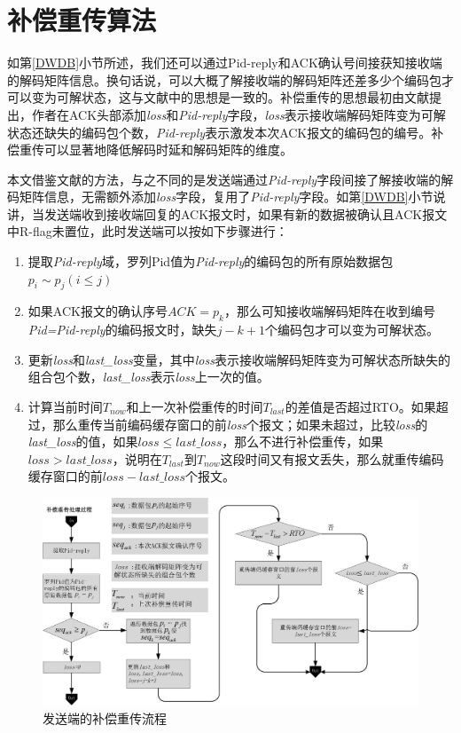 \section{补偿重传算法}\label{sec:loss}
如第\ref{DWDB}小节所述，我们还可以通过Pid-reply和ACK确认号间接获知接收端的解码矩阵信息。换句话说，可以大概了解接收端的解码矩阵还差多少个编码包才可以变为可解状态，这与文献\cite{song2011self}中的思想是一致的。补偿重传的思想最初由文献\cite{5403816}提出，作者在ACK头部添加\emph{loss}和\emph{Pid-reply}字段，\emph{loss}表示接收端解码矩阵变为可解状态还缺失的编码包个数，\emph{Pid-reply}表示激发本次ACK报文的编码包的编号。补偿重传可以显著地降低解码时延和解码矩阵的维度。
\par
本文借鉴文献\cite{5403816}的方法，与之不同的是发送端通过\emph{Pid-reply}字段间接了解接收端的解码矩阵信息，无需额外添加\emph{loss}字段，复用了\emph{Pid-reply}字段。如第\ref{DWDB}小节说讲，当发送端收到接收端回复的ACK报文时，如果有新的数据被确认且ACK报文中R-flag未置位，此时发送端可以按如下步骤进行：
\begin{enumerate}[fullwidth,itemindent=2em,label=(\arabic*)]
	\item 提取\emph{Pid-reply}域，罗列Pid值为\emph{Pid-reply}的编码包的所有原始数据包$p_i \sim p_j\left(i \le j\right)$
	\item 如果ACK报文的确认序号$ACK=p_k$，那么可知接收端解码矩阵在收到编号\emph{Pid=Pid-reply}的编码报文时，缺失$j-k+1$个编码包才可以变为可解状态。
	\item 更新\emph{loss}和\emph{last\_loss}变量，其中\emph{loss}表示接收端解码矩阵变为可解状态所缺失的组合包个数，\emph{last\_loss}表示\emph{loss}上一次的值。
	\item 计算当前时间$T_{now}$和上一次补偿重传的时间$T_{last}$的差值是否超过RTO。如果超过，那么重传当前编码缓存窗口的前\emph{loss}个报文；如果未超过，比较\emph{loss}的\emph{last\_loss}的值，如果$loss \le last\_loss$，那么不进行补偿重传，如果$loss > last\_loss$，说明在$T_{last}$到$T_{now}$这段时间又有报文丢失，那么就重传编码缓存窗口的前$loss-last\_loss$个报文。
\end{enumerate}
\begin{figure}[htbp]
	\centering
	\includegraphics[width=6in]{figures/bccc.eps}
	\caption{发送端的补偿重传流程}
	\label{BCCC_EPS}
\end{figure}
